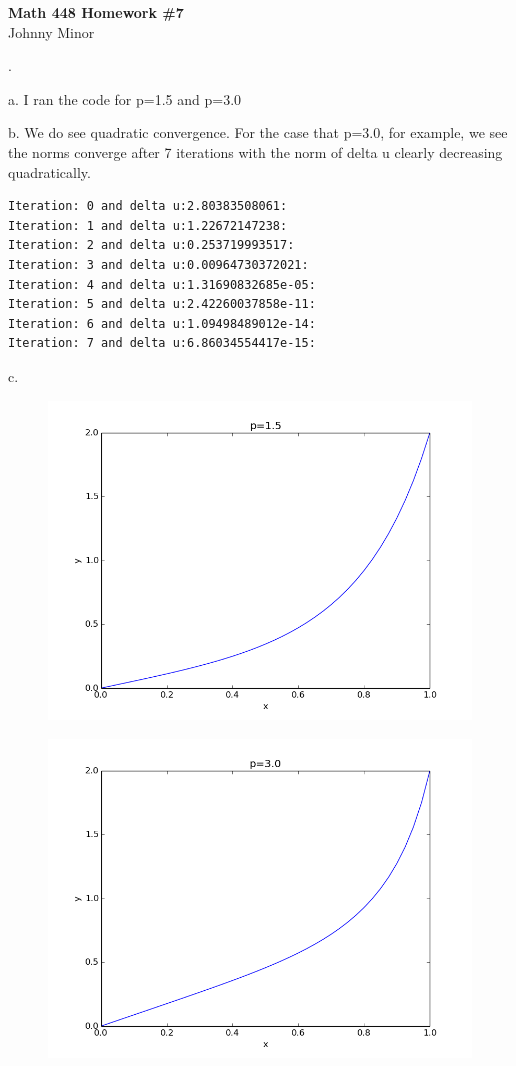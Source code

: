 \documentclass[10pt, leqno]{article}
\begin{document}
\begin{centering}

\textbf{Math 448 Homework \#7} \\
Johnny Minor 

\end{centering}
\medskip 

. 

\noindent a. I ran the code for p=1.5 and p=3.0 
\medskip 

\noindent b. We do see quadratic convergence. For the case that p=3.0, for example, we see the norms converge after 7 iterations with the norm of delta u clearly decreasing quadratically. 
\begin{verbatim}
Iteration: 0 and delta u:2.80383508061:
Iteration: 1 and delta u:1.22672147238:
Iteration: 2 and delta u:0.253719993517:
Iteration: 3 and delta u:0.00964730372021:
Iteration: 4 and delta u:1.31690832685e-05:
Iteration: 5 and delta u:2.42260037858e-11:
Iteration: 6 and delta u:1.09498489012e-14:
Iteration: 7 and delta u:6.86034554417e-15:
\end{verbatim}


\noindent c. 
\begin{figure}[H]
  \centering
    \includegraphics[width=.75\textwidth]{homework7_p15.png}
    \label{fig:s_and_p}
\end{figure}

\begin{figure}[H]
  \centering
    \includegraphics[width=.75\textwidth]{homework7_p30.png}
    \label{fig:s_and_p}
\end{figure}
\end{document}
